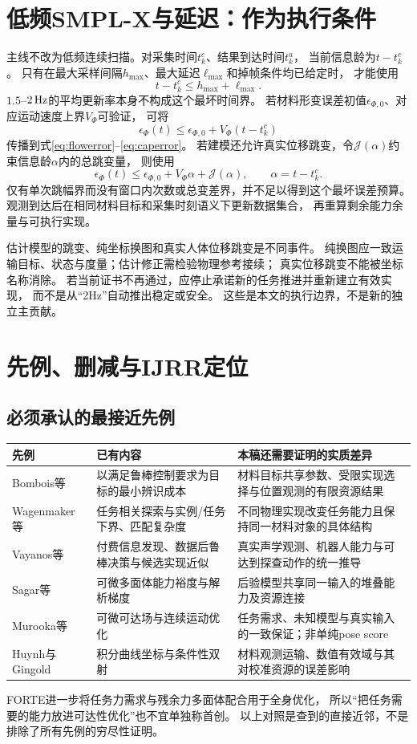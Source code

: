 \documentclass[11pt,a4paper]{article}
\numberwithin{equation}{section}
\theoremstyle{definition}
\begin{document}
\section{低频SMPL-X与延迟：作为执行条件}
主线不改为低频连续扫描。对采集时间$t_k^c$、结果到达时间$t_k^a$，
当前信息龄为$t-t_k^c$。
只有在最大采样间隔$h_{\max}$、最大延迟$\ell_{\max}$和掉帧条件均已给定时，
才能使用
\[
 t-t_k^c\le h_{\max}+\ell_{\max}.
\]
$1.5$--$2\,{\rm Hz}$的平均更新率本身不构成这个最坏时间界。
若材料形变误差初值$\epsilon_{\Phi,0}$、对应运动速度上界$V_\Phi$可验证，
可将
\[
 \epsilon_\Phi(t)\le
 \epsilon_{\Phi,0}+V_\Phi(t-t_k^c)
\]
传播到式\eqref{eq:flowerror}--\eqref{eq:caperror}。
若建模还允许真实位移跳变，令$\mathcal J(\alpha)$约束信息龄$\alpha$内的总跳变量，
则使用
\[
 \epsilon_\Phi(t)\le\epsilon_{\Phi,0}+V_\Phi\alpha+\mathcal J(\alpha),
 \qquad\alpha=t-t_k^c.
\]
仅有单次跳幅界而没有窗口内次数或总变差界，并不足以得到这个最坏误差预算。
观测到达后在相同材料目标和采集时刻语义下更新数据集合，
再重算剩余能力余量与可执行实现。

估计模型的跳变、纯坐标换图和真实人体位移跳变是不同事件。
纯换图应一致运输目标、状态与度量；估计修正需检验物理参考接续；
真实位移跳变不能被坐标名称消除。
若当前证书不再通过，应停止承诺新的任务推进并重新建立有效实现，
而不是从“2Hz”自动推出稳定或安全。
这些是本文的执行边界，不是新的独立主贡献。

\section{先例、删减与IJRR定位}
\subsection{必须承认的最接近先例}
\begin{longtable}{p{}p{}p{}}
\toprule
先例 & 已有内容 & 本稿还需要证明的实质差异\\
\midrule
\endhead
Bombois等\cite{bombois2006} &
以满足鲁棒控制要求为目标的最小辨识成本 &
材料目标共享参数、受限实现选择与位置观测的有限资源结果\\
Wagenmaker等\cite{wagenmaker2021} &
任务相关探索与实例/任务下界、匹配复杂度 &
不同物理实现改变任务能力且保持同一材料对象的具体结构\\
Vayanos等\cite{vayanos2020} &
付费信息发现、数据后鲁棒决策与候选实现近似 &
真实声学观测、机器人能力与可达到探查动作的统一推导\\
Sagar等\cite{sagar2023} &
可微多面体能力裕度与解析梯度 &
后验模型共享同一输入的堆叠能力及资源连接\\
Murooka等\cite{murooka2025} &
可微可达场与连续运动优化 &
任务需求、未知模型与真实输入的一致保证；非单纯pose score\\
Huynh与Gingold\cite{huynh2015} &
积分曲线坐标与条件性双射 &
材料观测运输、数值有效域与其对校准资源的误差影响\\
\bottomrule
\end{longtable}
FORTE进一步将任务力需求与残余力多面体配合用于全身优化\cite{forte2026}，
所以“把任务需要的能力放进可达性优化”也不宜单独称首创。
以上对照是查到的直接近邻，不是排除了所有先例的穷尽性证明。
\end{document}
